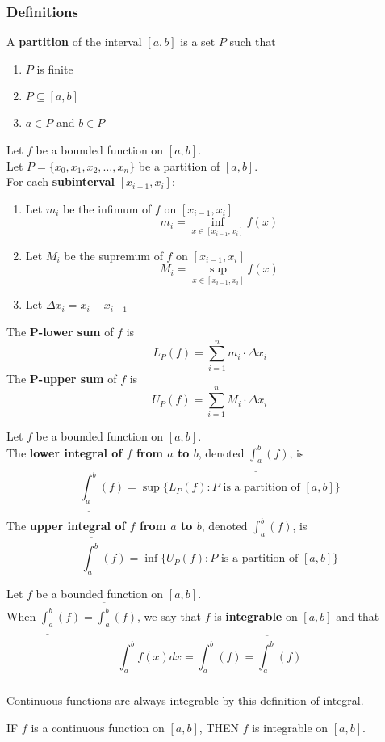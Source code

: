 \documentclass[11pt]{article}
\newenvironment{definition}[1][]{\begin{tcolorbox}[colframe=_orange,colback=_orange2,title=Definition. \ifthenelse{\isempty{#1}}{}{(#1)}
]}{\end{tcolorbox}}
\newenvironment{theorem}[1][]{\begin{tcolorbox}[colframe=_blue,colback=_blue2,title=Theorem. \ifthenelse{\isempty{#1}}{}{(#1)}
]}{\end{tcolorbox}}
\begin{document}
\subsubsection{Definitions}
\begin{definition}[Partition]
    A \textbf{partition} of the interval $[a,b]$ is a set $P$ such that
    \begin{enumerate}
        \item $P$ is finite
        \item $P\subseteq[a,b]$
        \item $a\in P$ and $b\in P$
    \end{enumerate}
\end{definition}
\begin{definition}[Upper and Lower Sums]
    Let $f$ be a bounded function on $[a,b]$. \\
    Let $P=\{x_0,x_1,x_2,\dots,x_n\}$ be a partition of $[a,b]$. \\
    For each \textbf{subinterval} $[x_{i-1}, x_i]$:
    \begin{enumerate}
        \item Let $m_i$ be the infimum of $f$ on $[x_{i-1},x_i]$
              $$
                  m_i=\inf_{x\in[x_{i-1},x_i]}f(x)
              $$
        \item Let $M_i$ be the supremum of $f$ on $[x_{i-1},x_i]$
              $$
                  M_i=\sup_{x\in[x_{i-1},x_i]}f(x)
              $$
        \item Let $\Delta x_i=x_i-x_{i-1}$
    \end{enumerate}
    The \textbf{P-lower sum} of $f$ is
    $$
        L_P(f)=\sum_{i=1}^n m_i\cdot \Delta x_i
    $$
    The \textbf{P-upper sum} of $f$ is
    $$
        U_P(f)=\sum_{i=1}^n M_i\cdot \Delta x_i
    $$
\end{definition}
\begin{definition}[Upper and Lower Integral]
    Let $f$ be a bounded function on $[a,b]$. \\
    The \textbf{lower integral of $f$ from $a$ to $b$}, denoted $\underline{\int^b_a}(f)$, is
    $$
        \underline{\int^b_a}(f)=\sup\{L_P(f):P\text{ is a partition of }[a,b]\}
    $$
    The \textbf{upper integral of $f$ from $a$ to $b$}, denoted $\overline{\int^b_a}(f)$, is
    $$
        \overline{\int^b_a}(f)=\inf\{U_P(f):P\text{ is a partition of }[a,b]\}
    $$
\end{definition}
\begin{definition}[Darboux Integrability]
    Let $f$ be a bounded function on $[a,b]$. \\
    When $\underline{\int^b_a}(f)=\overline{\int^b_a}(f)$, we say that $f$ is \textbf{integrable} on $[a,b]$ and that
    $$
        \int^b_a f(x)dx=\underline{\int^b_a}(f)=\overline{\int^b_a}(f)
    $$
\end{definition}
Continuous functions are always integrable by this definition of integral.
\begin{theorem}
    IF $f$ is a continuous function on $[a,b]$, THEN $f$ is integrable on $[a,b]$.
\end{theorem}
\end{document}
